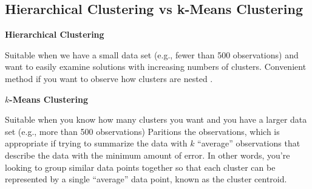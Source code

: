 \documentclass{report}
\begin{document}
  \subsection{Hierarchical Clustering vs k-Means Clustering}
  \bigbreak \noindent \bigbreak \noindent
\begin{minipage}{0.5\textwidth}
  \begin{center}
    \textbf{Hierarchical Clustering} 
  \end{center}	
  Suitable when we have a small data set (e.g., fewer than 500 observations) and want to easily examine solutions with increasing numbers of clusters.
  \bigbreak \noindent
Convenient method if you want to observe how clusters are nested  .
\end{minipage}
\hspace{6mm}\begin{minipage}{0.4\textwidth}
\begin{center}
  \textbf{$k$-Means Clustering} 
\end{center}	
Suitable when you know how many clusters you want and you have a larger data set (e.g., more than 500 observations)
\bigbreak \noindent
Paritions the observations, which is appropriate if trying to summarize the data with $k$ ``average'' observations that describe the data with the minimum amount of error. In other words, you're looking to group similar data points together so that each cluster can be represented by a single ``average'' data point, known as the cluster centroid.
\end{minipage}
\end{document}
